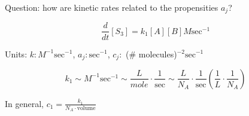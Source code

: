 \documentclass[10pt]{article}
\begin{document}
Question: how are kinetic rates related to the propensities $a_j$?

\[ \frac{d}{dt}[S_3] = k_1[A][B]M\text{sec}^{-1} \]

Units: $k: M^{-1}\text{sec}^{-1}$, $a_j: \text{sec}^{-1}$, $c_j:$ (\# molecules)$^{-2}\text{sec}^{-1}$

\[ k_1 \sim M^{-1}\text{sec}^{-1} \sim \frac{L}{mole}\cdot \frac{1}{\text{sec}} \sim \frac{L}{N_A}\cdot\frac{1}{\text{sec}}\left( \frac{1}{L}\cdot\frac{1}{N_A} \right) \]

In general, $c_1 = \frac{k_1}{N_A \cdot \text{volume}}$
\end{document}
